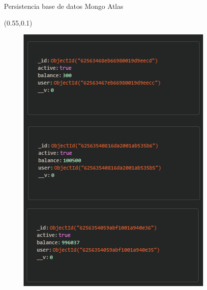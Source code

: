 \documentclass[xcolor=pdftex,dvipsnames,table]{beamer}
\begin{document}
\begin{frame}{Persistencia base de datos Mongo Atlas}
{    \begin{textblock*}{0.45\textwidth}(0.55\textwidth,0.1\textwidth)
    \begin{figure}[htb]
        \centering
        \captionsetup{justification=centering,margin=0.3cm}
        \includegraphics[width=1\linewidth]{func/stateacount .png}
    \end{figure}
    \end{textblock*}

}


\end{frame}


\end{document}
